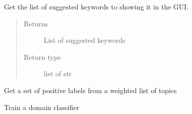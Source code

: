 \documentclass[letterpaper,10pt,english]{sphinxmanual}
\begin{document}
\begin{fulllineitems}
\begin{fulllineitems}
\end{fulllineitems}


\begin{fulllineitems}
\label{\detokenize{dc_task_manager:src.task_manager.TaskManagerGUI.get_suggested_keywords}}
\sphinxAtStartPar
Get the list of suggested keywords to showing it in the GUI.
\begin{quote}\begin{description}
\item[{Returns}] \leavevmode
\sphinxAtStartPar
{} \textendash{} List of suggested keywords

\item[{Return type}] \leavevmode
\sphinxAtStartPar
list of str

\end{description}\end{quote}

\end{fulllineitems}


\begin{fulllineitems}
\label{\detokenize{dc_task_manager:src.task_manager.TaskManagerGUI.get_topic_words}}
\sphinxAtStartPar
Get a set of positive labels from a weighted list of topics

\end{fulllineitems}


\begin{fulllineitems}
\label{\detokenize{dc_task_manager:src.task_manager.TaskManagerGUI.train_PUmodel}}
\sphinxAtStartPar
Train a domain classifier

\end{fulllineitems}


\end{fulllineitems}
\end{document}
